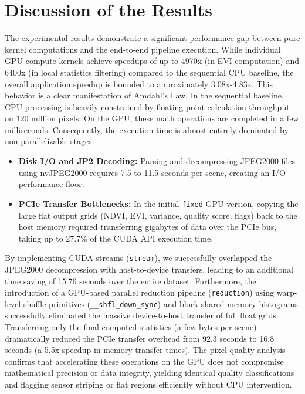\documentclass[10pt,conference,compsoc]{IEEEtran}
\begin{document}
\section{Discussion of the Results}
The experimental results demonstrate a significant performance gap between pure kernel computations and the end-to-end pipeline execution. While individual GPU compute kernels achieve speedups of up to 4970x (in EVI computation) and 6400x (in local statistics filtering) compared to the sequential CPU baseline, the overall application speedup is bounded to approximately 3.08x-4.83x. 
This behavior is a clear manifestation of Amdahl's Law. In the sequential baseline, CPU processing is heavily constrained by floating-point calculation throughput on 120 million pixels. On the GPU, these math operations are completed in a few milliseconds. Consequently, the execution time is almost entirely dominated by non-parallelizable stages:
\begin{itemize}
    \item \textbf{Disk I/O and JP2 Decoding:} Parsing and decompressing JPEG2000 files using nvJPEG2000 requires 7.5 to 11.5 seconds per scene, creating an I/O performance floor.
    \item \textbf{PCIe Transfer Bottlenecks:} In the initial \texttt{fixed} GPU version, copying the large flat output grids (NDVI, EVI, variance, quality score, flags) back to the host memory required transferring gigabytes of data over the PCIe bus, taking up to 27.7\% of the CUDA API execution time.
\end{itemize}
By implementing CUDA streams (\texttt{stream}), we successfully overlapped the JPEG2000 decompression with host-to-device transfers, leading to an additional time saving of 15.76 seconds over the entire dataset. Furthermore, the introduction of a GPU-based parallel reduction pipeline (\texttt{reduction}) using warp-level shuffle primitives (\texttt{\_\_shfl\_down\_sync}) and block-shared memory histograms successfully eliminated the massive device-to-host transfer of full float grids. Transferring only the final computed statistics (a few bytes per scene) dramatically reduced the PCIe transfer overhead from 92.3 seconds to 16.8 seconds (a 5.5x speedup in memory transfer times).
The pixel quality analysis confirms that accelerating these operations on the GPU does not compromise mathematical precision or data integrity, yielding identical quality classifications and flagging sensor striping or flat regions efficiently without CPU intervention.
\end{document}
